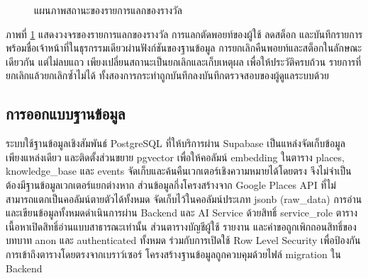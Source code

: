 \begin{figure}[H]
\centering
{}
\caption{แผนภาพสถานะของรายการแลกของรางวัล}
\label{fig:state_redemption}
\end{figure}

ภาพที่ \ref{fig:state_redemption} แสดงวงจรของรายการแลกของรางวัล การแลกตัดพอยท์ของผู้ใช้ ลดสต็อก และบันทึกรายการพร้อมชื่อเจ้าหน้าที่ในธุรกรรมเดียวผ่านฟังก์ชันของฐานข้อมูล การยกเลิกคืนพอยท์และสต็อกในลักษณะเดียวกัน แต่ไม่ลบแถว เพียงเปลี่ยนสถานะเป็นยกเลิกและเก็บเหตุผล เพื่อให้ประวัติครบถ้วน รายการที่ยกเลิกแล้วยกเลิกซ้ำไม่ได้ ทั้งสองการกระทำถูกบันทึกลงบันทึกตรวจสอบของผู้ดูแลระบบด้วย

\subsection{การออกแบบฐานข้อมูล}

ระบบใช้ฐานข้อมูลเชิงสัมพันธ์ PostgreSQL ที่ให้บริการผ่าน Supabase เป็นแหล่งจัดเก็บข้อมูลเพียงแหล่งเดียว และติดตั้งส่วนขยาย pgvector เพื่อให้คอลัมน์ embedding ในตาราง places, knowledge\_base และ events จัดเก็บและค้นคืนเวกเตอร์เชิงความหมายได้โดยตรง จึงไม่จำเป็นต้องมีฐานข้อมูลเวกเตอร์แยกต่างหาก ส่วนข้อมูลกึ่งโครงสร้างจาก Google Places API ที่ไม่สามารถแตกเป็นคอลัมน์ตายตัวได้ทั้งหมด จัดเก็บไว้ในคอลัมน์ประเภท jsonb (raw\_data) การอ่านและเขียนข้อมูลทั้งหมดดำเนินการผ่าน Backend และ AI Service ด้วยสิทธิ์ service\_role ตารางเนื้อหาเปิดสิทธิ์อ่านแบบสาธารณะเท่านั้น ส่วนตารางบัญชีผู้ใช้ รายงาน และคำขอถูกเพิกถอนสิทธิ์ของบทบาท anon และ authenticated ทั้งหมด ร่วมกับการเปิดใช้ Row Level Security เพื่อป้องกันการเข้าถึงตารางโดยตรงจากเบราว์เซอร์ โครงสร้างฐานข้อมูลถูกควบคุมด้วยไฟล์ migration ใน Backend 

